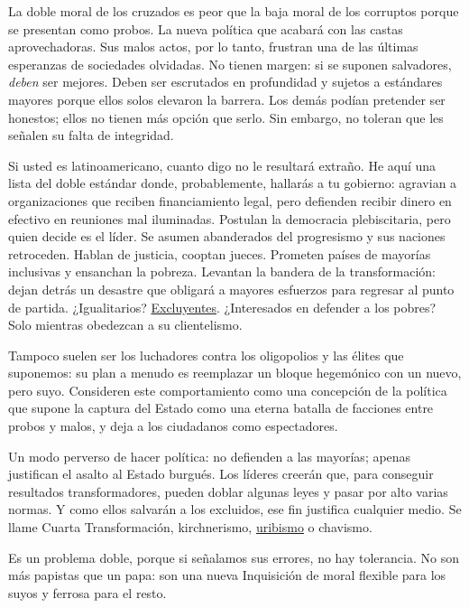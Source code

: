 La doble moral de los cruzados es peor que la baja moral de los
corruptos porque se presentan como probos. La nueva política que acabará
con las castas aprovechadoras. Sus malos actos, por lo tanto, frustran
una de las últimas esperanzas de sociedades olvidadas. No tienen margen:
si se suponen salvadores, \emph{deben} ser mejores. Deben ser escrutados
en profundidad y sujetos a estándares mayores porque ellos solos
elevaron la barrera. Los demás podían pretender ser honestos; ellos no
tienen más opción que serlo. Sin embargo, no toleran que les señalen su
falta de integridad.

Si usted es latinoamericano, cuanto digo no le resultará extraño. He
aquí una lista del doble estándar donde, probablemente, hallarás a tu
gobierno: agravian a organizaciones que reciben financiamiento legal,
pero defienden recibir dinero en efectivo en reuniones mal iluminadas.
Postulan la democracia plebiscitaria, pero quien decide es el líder. Se
asumen abanderados del progresismo y sus naciones retroceden. Hablan de
justicia, cooptan jueces. Prometen países de mayorías inclusivas y
ensanchan la pobreza. Levantan la bandera de la transformación: dejan
detrás un desastre que obligará a mayores esfuerzos para regresar al
punto de partida. ¿Igualitarios?
\href{https://politica.expansion.mx/voces/2020/05/13/columnainvitada-misoginia-en-la-4t}{Excluyentes}.
¿Interesados en defender a los pobres? Solo mientras obedezcan a su
clientelismo.

Tampoco suelen ser los luchadores contra los oligopolios y las élites
que suponemos: su plan a menudo es reemplazar un bloque hegemónico con
un nuevo, pero suyo. Consideren este comportamiento como una concepción
de la política que supone la captura del Estado como una eterna batalla
de facciones entre probos y malos, y deja a los ciudadanos como
espectadores.

Un modo perverso de hacer política: no defienden a las mayorías; apenas
justifican el asalto al Estado burgués. Los líderes creerán que, para
conseguir resultados transformadores, pueden doblar algunas leyes y
pasar por alto varias normas. Y como ellos salvarán a los excluidos, ese
fin justifica cualquier medio. Se llame Cuarta Transformación,
kirchnerismo,
\href{https://www.nytimes3xbfgragh.onion/es/2020/08/23/espanol/opinion/colombia-alvaro-uribe.html}{uribismo}
o chavismo.

Es un problema doble, porque si señalamos sus errores, no hay
tolerancia. No son más papistas que un papa: son una nueva Inquisición
de moral flexible para los suyos y ferrosa para el resto.

